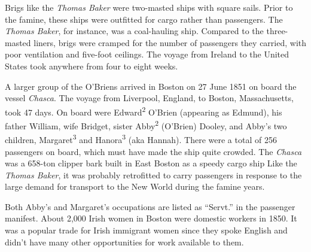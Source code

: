 Brigs like the \textit{Thomas Baker} were two-masted ships with square sails.\cite{OHanlon:35} Prior to the famine, these ships were outfitted for cargo rather than passengers.\cite{Laxton:9} The \textit{Thomas Baker}, for instance, was a coal-hauling ship.\cite{MorningAdvertiser} Compared to the three-masted liners, brigs were cramped for the number of passengers they carried, with poor ventilation and five-foot ceilings.\cite{OHanlon:33} The voyage from Ireland to the United States took anywhere from four to eight weeks.

A larger group of the O'Briens arrived in Boston on 27 June 1851 on board the vessel \textit{Chasca}\cite{Chascay}. The voyage from Liverpool, England, to Boston, Massachusetts, took 47 days.\cite{Chascay2} On board were Edward\textsuperscript{2} O'Brien (appearing as Edmund\cite{Edmund}), his father William, wife Bridget, sister Abby\textsuperscript{2} (O'Brien) Dooley, and Abby's two children, Margaret\textsuperscript{3} and Hanora\textsuperscript{3} (aka Hannah). There were a total of 256 passengers on board,\cite{Chascay3} which must have made the ship quite crowded. The \textit{Chasca} was a 658-ton clipper bark built in East Boston as a speedy cargo ship\cite{ChascaCard,Chascay} Like the \textit{Thomas Baker}, it was probably retrofitted to carry passengers in response to the large demand for transport to the New World during the famine years.

Both Abby's and Margaret's occupations are listed as ``Servt.'' in the passenger manifest.\cite{Chascay} About 2,000 Irish women in Boston were domestic workers in 1850. It was a popular trade for Irish immigrant women since they spoke English and didn't have many other opportunities for work available to them.\cite{Ryan:41}

